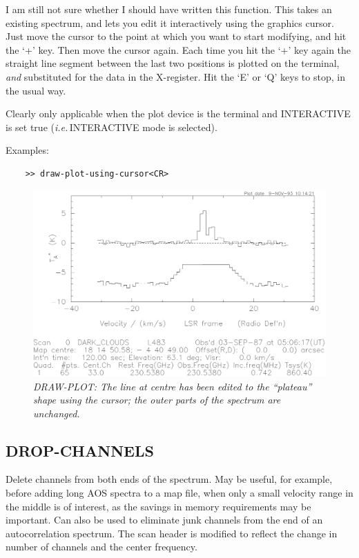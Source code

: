 \documentclass[11pt,twoside]{report}
\newcommand{\ie}{{\it i.e.\,}}
\begin{document}
I am still not sure whether I should have written this function. This
takes an existing spectrum, and lets you edit it interactively using the
graphics cursor. Just move the cursor to the point at which you want to
start modifying, and hit the `+' key. Then move the cursor again. Each time
you hit the `+' key again the straight line segment between the last two
positions is plotted on the terminal, {\em and} substituted for the data
in the X-register. Hit the `E' or `Q' keys to stop, in the usual way.

Clearly only applicable when the plot device is the terminal and
INTERACTIVE is set true (\ie INTERACTIVE mode is selected).

Examples:
\begin{verbatim}
    >> draw-plot-using-cursor<CR>
\end{verbatim}

\begin{figure}[htbp]
\begin{center}
\includegraphics[scale=0.65]{draw-plot.ps}
\protect\parbox{5.5in}
{\caption[DRAW]
{\sl
DRAW-PLOT: The line at centre has been edited to the ``plateau'' shape
using the cursor; the outer parts of the spectrum are unchanged.
\label{DRAW}
}
}
\end{center}
\end{figure}

\subsection{DROP-CHANNELS} 

Delete channels from both ends of the spectrum. May be useful, for example,
before adding long AOS spectra to a map file, when only a small velocity
range in the middle is of interest, as the savings in memory requirements
may be important. Can also be used to eliminate junk channels
 from the end
of an autocorrelation spectrum. The scan header is modified to reflect
the change in number of channels and the center frequency.
\end{document}

